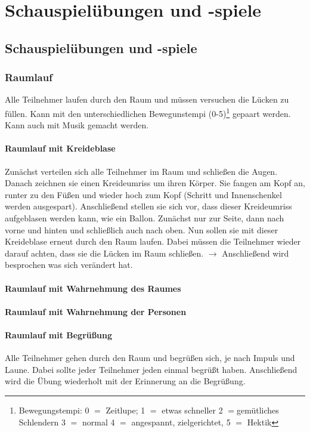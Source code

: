 \documentclass[ngerman, a4paper, twoside]{scrbook}%
\begin{document}
	\setcounter{chapter}{0}
	\setcounter{section}{0}
	\part{Schauspielübungen und -spiele}
	\chapter{Schauspielübungen und -spiele}

	\section{Raumlauf}
	Alle Teilnehmer laufen durch den Raum und müssen versuchen die Lücken zu füllen. Kann mit den unterschiedlichen Bewegunstempi (0-5)\footnote{Bewegungstempi: 0 $=$ Zeitlupe; 1 $=$ etwas schneller 2 $=$gemütliches Schlendern 3 $=$ normal 4 $=$ angespannt, zielgerichtet, 5 $=$ Hektik}  gepaart werden. Kann auch mit Musik gemacht werden.
	\subsection{Raumlauf mit Kreideblase}
	Zunächst verteilen sich alle Teilnehmer im Raum und schließen die Augen. Danach zeichnen sie einen Kreideumriss um ihren Körper. Sie fangen am Kopf an, runter zu den Füßen und wieder hoch zum Kopf (Schritt und Innenschenkel werden ausgespart). Anschließend stellen sie sich vor, dass dieser Kreideumriss aufgeblasen werden kann, wie ein Ballon. Zunächst nur zur Seite, dann nach vorne und hinten und schließlich auch nach oben. Nun sollen sie mit dieser Kreideblase erneut durch den Raum laufen. Dabei müssen die Teilnehmer wieder darauf achten, dass sie die Lücken im Raum schließen. $\rightarrow$ Anschließend wird besprochen was sich verändert hat.
	\subsection{Raumlauf mit Wahrnehmung des Raumes}
	\subsection{Raumlauf mit Wahrnehmung der Personen}
	\subsection{Raumlauf mit Begrüßung}
	Alle Teilnehmer gehen durch den Raum und begrüßen sich, je nach Impuls und Laune. Dabei sollte jeder Teilnehmer jeden einmal begrüßt haben. Anschließend wird die Übung wiederholt mit der Erinnerung an die Begrüßung.
\end{document}
